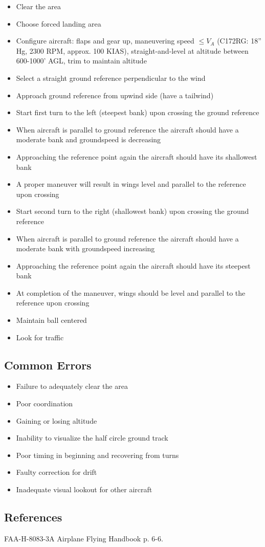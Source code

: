 \begin{itemize}
  \item Clear the area
  \item Choose forced landing area 
  \item Configure aircraft: flaps and gear up, maneuvering speed $\leq V_A$
    (C172RG: 18'' Hg, 2300 RPM, approx. 100 KIAS), straight-and-level at
    altitude between 600-1000' AGL, trim to maintain altitude
  \item Select a straight ground reference perpendicular to the wind
  \item Approach ground reference from upwind side (have a tailwind)
  \item Start first turn to the left (steepest bank) upon crossing the ground
    reference
  \item When aircraft is parallel to ground reference the aircraft should have
    a moderate bank and groundspeed is decreasing
  \item Approaching the reference point again the aircraft should have its
    shallowest bank
  \item A proper maneuver will result in wings level and parallel to the
    reference upon crossing
  \item Start second turn to the right (shallowest bank) upon crossing the
    ground reference
  \item When aircraft is parallel to ground reference the aircraft should have
    a moderate bank with groundspeed increasing
  \item Approaching the reference point again the aircraft should have its
    steepest bank
  \item At completion of the maneuver, wings should be level and parallel to
    the reference upon crossing
  \item Maintain ball centered
  \item Look for traffic
\end{itemize}

\subsection{Common Errors}

\begin{itemize}
  \item Failure to adequately clear the area
  \item Poor coordination
  \item Gaining or losing altitude
  \item Inability to visualize the half circle ground track
  \item Poor timing in beginning and recovering from turns
  \item Faulty correction for drift
  \item Inadequate visual lookout for other aircraft
\end{itemize}

\subsection{References}

FAA-H-8083-3A Airplane Flying Handbook p. 6-6.


